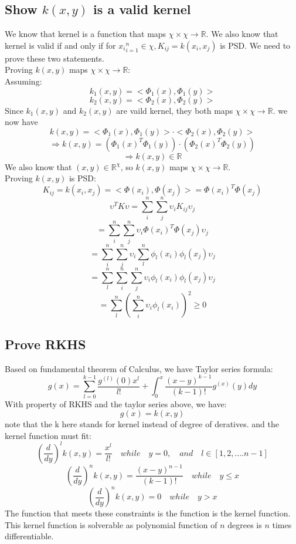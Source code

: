 \documentclass[twoside]{article}
\theoremstyle{definition}
\theoremstyle{definition}
\theoremstyle{remark}
\def\R{{\mathbb R}}
\begin{document}
\subsection{Show $k(x,y)$ is a valid kernel}
We know that kernel is a function that maps $\chi \times \chi \rightarrow \R$. 
We also know that kernel is valid if and only if for ${x_i}_{i=1}^n \in \chi, K_{ij} = k(x_i,x_j)$ is PSD. We need to prove these two statements.\\ 
Proving $k(x,y)$ maps $\chi \times \chi \rightarrow \R$:\\ 
Assuming:
\[k_1(x,y) = <\Phi_1(x),\Phi_1(y)>\]
\[k_2(x,y) = <\Phi_2(x),\Phi_2(y)>\]
Since $k_1(x,y)$ and $k_2(x,y)$ are vaild kernel, they both maps $\chi \times \chi \rightarrow \R$. 
we now have 
\[k(x,y) = <\Phi_1(x),\Phi_1(y)>\cdot <\Phi_2(x),\Phi_2(y)>\]
\[\Rightarrow k(x,y) = (\Phi_1(x)^T \Phi_1(y))\cdot(\Phi_2(x)^T\Phi_2(y))\]
\[\Rightarrow k(x,y) \in \R\]
We also know that $(x,y) \in \R^\chi$, so $k(x,y)$ maps $\chi \times \chi \rightarrow \R$.\\
Proving $k(x,y)$ is PSD:
\[K_{ij} = k(x_i,x_j) =  <\Phi(x_i),\Phi(x_j)> =\Phi(x_i)^T\Phi(x_j) \]
\[\upsilon^T K \upsilon = \sum_i^n \sum_j^n \upsilon_i K_{ij} \upsilon_j\]
\[=\sum_i^n \sum_j^n \upsilon_i \Phi(x_i)^T\Phi(x_j) \upsilon_j\]
\[=\sum_i^n \sum_j^n \upsilon_i \sum_l^n \phi_l(x_i)\phi_l(x_j) \upsilon_j\]
\[=\sum_l^n \sum_i^n \sum_j^n \upsilon_i \phi_l(x_i)\phi_l(x_j) \upsilon_j\]
\[=\sum_l^n(\sum_i^n \upsilon_i \phi_l(x_i))^2 \geq 0\]
\subsection{Prove RKHS}
Based on fundamental theorem of Calculus, we have Taylor series formula:
\[ g(x) = \sum_{l=0}^{k-1}\frac{g^{(l)}(0)x^l}{l!} + \int_{0}^{x} \frac{(x-y)^{k-1}}{(k-1)!}g^{(x)}(y)dy\]
With property of RKHS and the taylor series above, we have:
\[g(x) = k(x,y) \]
note that the k here stands for kernel instead of degree of deratives.
and the kernel function must fit:
\[(\frac{d}{dy})^l k(x,y) = \frac{x^l}{l!} \quad while\quad y = 0 ,\quad and\quad l \in [1,2,....n-1]\]
\[(\frac{d}{dy})^{n} k(x,y) = \frac{(x-y)^{n-1}}{(k-1)!} \quad while\quad y \leq x\]
\[(\frac{d}{dy})^{n} k(x,y) = 0 \quad while\quad y > x\]
The function that meets these constraints is the function is the kernel function. This kernel function is solverable as polynomial function of $n$ degrees is $n$ times differentiable.
\end{document}
